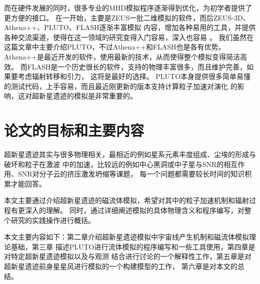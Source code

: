 而在硬件发展的同时，很多专业的MHD模拟程序逐渐得到优化，为初学者提供了更方便的接口。
在一开始，主要是ZEUS一批二维模拟的软件，而后ZEUS-3D、Athena++、PLUTO、FLASH逐渐丰富模拟
内容，增加各种易用的工具，并提供各种交流渠道，使得在这一领域的研究变得入门容易，深入也容易
\citep{Stone1992b, Stone1992, Stone1992a, White2016, Mignone2007, Mignone2012, Fryxell2000}。
我们虽然在这篇文章中主要介绍PLUTO，不过Athena++和FLASH也是各有优势。
Athena++是最近开发的软件，使用最新的技术，从而使得整个模拟变得简洁高效。
而FLASH是一个历史很长的软件，支持的物理丰富很多，而且维护完善，如果要考虑辐射转移和引力，
这将是最好的选择。
PLUTO本身提供很多简单易懂的测试代码，上手容易，而且最近刚更新的版本支持计算粒子加速对演化
的影响，这对超新星遗迹的模拟是非常重要的。

\section{论文的目标和主要内容}
\label{Aim}
超新星遗迹其实与很多物理相关，最相近的例如星系元素丰度组成、尘埃的形成与破坏和粒子在激波
中的加速，比较远的例如中心黑洞或中子星与SNR的相互作用、SNR对分子云的挤压激发坍缩等课题，
每一个问题都需要较长时间的知识积累才能回答。

本文主要通过介绍超新星遗迹的磁流体模拟，希望对其中的粒子加速机制和辐射过程有更深入的理解。
同时，通过详细阐述模拟的具体物理含义和程序编写，对整个研究的实践操作进行概括。

本文主要内容如下：第二章介绍超新星遗迹模拟中宇宙线产生机制和磁流体模拟理论基础，第三章
描述PLUTO进行流体模拟的程序编写和一些工具使用，第四章是对特定超新星遗迹模拟以及与观测
结合进行讨论的一个解释性工作，第五章是对超新星遗迹前身星星风进行模拟的一个构建模型的工作，
第六章是对本文的总结。
